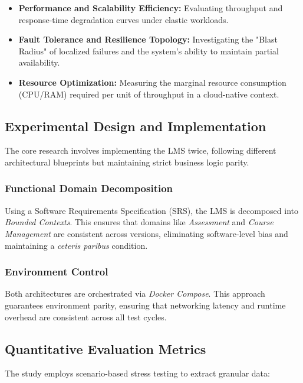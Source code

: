 \begin{itemize}
    \item \textbf{Performance and Scalability Efficiency:} Evaluating throughput and response-time degradation curves under elastic workloads.
    
    \item \textbf{Fault Tolerance and Resilience Topology:} Investigating the "Blast Radius" of localized failures and the system's ability to maintain partial availability.
    
    \item \textbf{Resource Optimization:} Measuring the marginal resource consumption (CPU/RAM) required per unit of throughput in a cloud-native context.
\end{itemize}

\subsection{Experimental Design and Implementation}

The core research involves implementing the LMS twice, following different architectural blueprints but maintaining strict business logic parity.

\subsubsection{Functional Domain Decomposition}
Using a Software Requirements Specification (SRS), the LMS is decomposed into \textit{Bounded Contexts}. This ensures that domains like \textit{Assessment} and \textit{Course Management} are consistent across versions, eliminating software-level bias and maintaining a \textit{ceteris paribus} condition.

\subsubsection{Environment Control}
Both architectures are orchestrated via \textit{Docker Compose}. This approach guarantees environment parity, ensuring that networking latency and runtime overhead are consistent across all test cycles.

\subsection{Quantitative Evaluation Metrics}

The study employs scenario-based stress testing to extract granular data:

